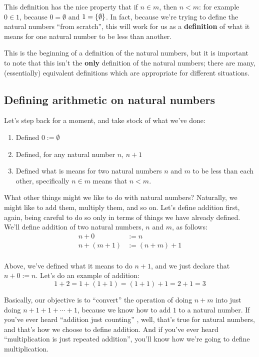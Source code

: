 This definition has the nice property that if $n \in m$, then $n < m$: for example $0 \in 1$, because $0 = \emptyset$ and $1 = {\left\{ {\emptyset} \right\}}$.
In fact, because we're trying to define the natural numbers ``from scratch'', this will work for us as a \textbf{definition} of what it means for one natural number to be less than another.

This is the beginning of a definition of the natural numbers, but it is important to note that this isn't the \textbf{only} definition of the natural numbers; there are many, (essentially) equivalent definitions which are appropriate for different situations.

\subsection{Defining arithmetic on natural numbers}

Let's step back for a moment, and take stock of what we've done:

\begin{enumerate}
    \item Defined $0 := \emptyset$
    \item Defined, for any natural number $n$, $n + 1$
    \item Defined what is means for two natural numbers $n$ and $m$ to be less than each other, specifically $n \in m$ means that $n < m$.
\end{enumerate}

What other things might we like to do with natural numbers?
Naturally, we might like to add them, multiply them, and so on.
Let's define addition first, again, being careful to do so only in terms of things we have already defined.
We'll define addition of two natural numbers, $n$ and $m$, as follows:
\begin{align*}
    n + 0 &:= n \\
    n + (m + 1) &:= (n + m) + 1 \\
\end{align*}

Above, we've defined what it means to do $n + 1$, and we just declare that $n + 0 := n$.
Let's do an example of addition:
\[
    1 + 2 = 1 + (1 + 1) = (1 + 1) + 1 = 2 + 1 = 3
\]

Basically, our objective is to ``convert'' the operation of doing $n + m$ into just doing $n + 1 + 1 + \cdots + 1$, because we know how to add $1$ to a natural number.
If you've ever heard ``addition just counting'' , well, that's true for natural numbers, and that's how we choose to define addition.
And if you've ever heard ``multiplication is just repeated addition'', you'll know how we're going to define multiplication.


